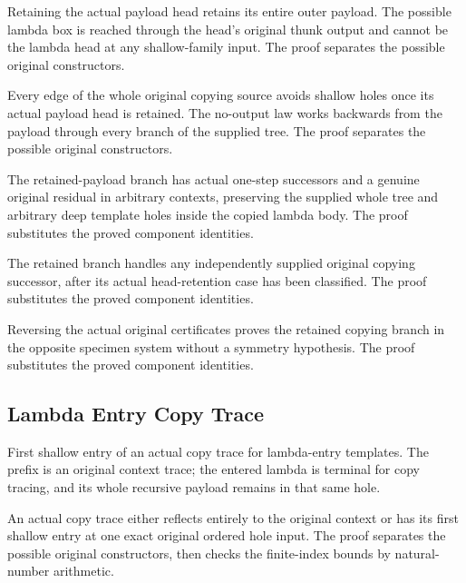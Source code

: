 Retaining the actual payload head retains its entire outer payload.
The possible lambda box is reached through the head's original thunk output
and cannot be the lambda head at any shallow-family input.
The proof separates the possible original constructors.
\par{}

Every edge of the whole original copying source avoids shallow holes
once its actual payload head is retained. The no-output law works backwards
from the payload through every branch of the supplied tree.
The proof separates the possible original constructors.
\par{}

The retained-payload branch has actual one-step successors and a genuine
original residual in arbitrary contexts, preserving the supplied whole tree
and arbitrary deep template holes inside the copied lambda body.
The proof substitutes the proved component identities.
\par{}

The retained branch handles any independently supplied original copying
successor, after its actual head-retention case has been classified.
The proof substitutes the proved component identities.
\par{}

Reversing the actual original certificates proves the retained copying
branch in the opposite specimen system without a symmetry hypothesis.
The proof substitutes the proved component identities.
\par{}

\subsection{Lambda Entry Copy Trace}
First shallow entry of an actual copy trace for lambda-entry templates.
The prefix is an original context trace; the entered lambda is terminal for
copy tracing, and its whole recursive payload remains in that same hole.

An actual copy trace either reflects entirely to the original context
or has its first shallow entry at one exact original ordered hole input.
The proof separates the possible original constructors, then checks the finite-index bounds by natural-number arithmetic.
\par{}

